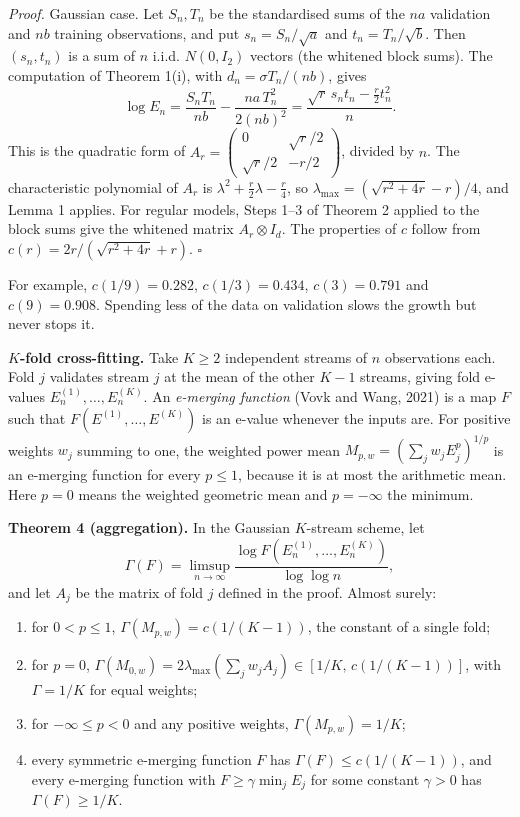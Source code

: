 \documentclass[
  10pt,
  a4paper,
]{article}
\begin{document}
\emph{Proof.} Gaussian case. Let \(S_n,T_n\) be the standardised sums of
the \(na\) validation and \(nb\) training observations, and put
\(s_n=S_n/\sqrt a\) and \(t_n=T_n/\sqrt b\). Then \((s_n,t_n)\) is a sum
of \(n\) i.i.d. \(N(0,I_2)\) vectors (the whitened block sums). The
computation of Theorem 1(i), with \(d_n=\sigma T_n/(nb)\), gives
\[\log E_n=\frac{S_nT_n}{nb}-\frac{na\,T_n^2}{2(nb)^2}=\frac{\sqrt r\,s_nt_n-\tfrac r2t_n^2}{n}.\]
This is the quadratic form of
\(A_r=\begin{pmatrix}0&\sqrt r/2\\\sqrt r/2&-r/2\end{pmatrix}\), divided
by \(n\). The characteristic polynomial of \(A_r\) is
\(\lambda^2+\tfrac r2\lambda-\tfrac r4\), so
\(\lambda_{\max}=(\sqrt{r^2+4r}-r)/4\), and Lemma 1 applies. For regular
models, Steps 1--3 of Theorem 2 applied to the block sums give the
whitened matrix \(A_r\otimes I_d\). The properties of \(c\) follow from
\(c(r)=2r/(\sqrt{r^2+4r}+r)\). \(\square\)

For example, \(c(1/9)=0.282\), \(c(1/3)=0.434\), \(c(3)=0.791\) and
\(c(9)=0.908\). Spending less of the data on validation slows the growth
but never stops it.

\textbf{\(K\)-fold cross-fitting.} Take \(K\ge2\) independent streams of
\(n\) observations each. Fold \(j\) validates stream \(j\) at the mean
of the other \(K-1\) streams, giving fold e-values
\(E^{(1)}_n,\dots,E^{(K)}_n\). An \emph{e-merging function} (Vovk and
Wang, 2021) is a map \(F\) such that \(F(E^{(1)},\dots,E^{(K)})\) is an
e-value whenever the inputs are. For positive weights \(w_j\) summing to
one, the weighted power mean \(M_{p,w}=(\sum_jw_jE_j^p)^{1/p}\) is an
e-merging function for every \(p\le1\), because it is at most the
arithmetic mean. Here \(p=0\) means the weighted geometric mean and
\(p=-\infty\) the minimum.

\textbf{Theorem 4 (aggregation).} In the Gaussian \(K\)-stream scheme,
let
\[\Gamma(F)=\limsup_{n\to\infty}\frac{\log F(E^{(1)}_n,\dots,E^{(K)}_n)}{\log\log n},\]
and let \(A_j\) be the matrix of fold \(j\) defined in the proof. Almost
surely:

\begin{enumerate}
\def\labelenumi{(\roman{enumi})}
\item
  for \(0<p\le1\), \(\Gamma(M_{p,w})=c(1/(K-1))\), the constant of a
  single fold;
\item
  for \(p=0\),
  \(\Gamma(M_{0,w})=2\lambda_{\max}(\sum_jw_jA_j)\in[1/K,\,c(1/(K-1))]\),
  with \(\Gamma=1/K\) for equal weights;
\item
  for \(-\infty\le p<0\) and any positive weights,
  \(\Gamma(M_{p,w})=1/K\);
\item
  every symmetric e-merging function \(F\) has
  \(\Gamma(F)\le c(1/(K-1))\), and every e-merging function with
  \(F\ge\gamma\min_jE_j\) for some constant \(\gamma>0\) has
  \(\Gamma(F)\ge1/K\).
\end{enumerate}
\end{document}
